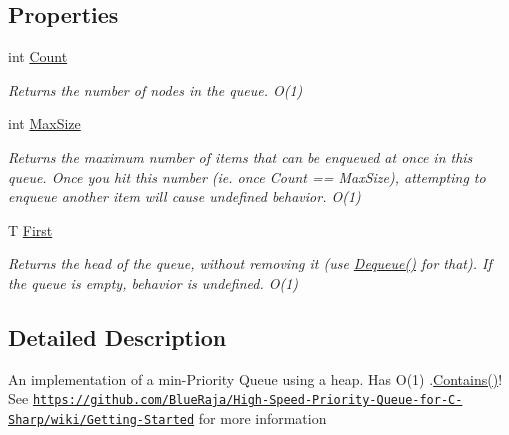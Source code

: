 \subsection*{Properties}
\begin{DoxyCompactItemize}
\item 
int \hyperlink{class_priority___queue_1_1_fast_priority_queue_ae439e87d078e219b8bcd8fa59f3b5750}{Count}
\begin{DoxyCompactList}\small\item\em Returns the number of nodes in the queue. O(1) \end{DoxyCompactList}\item 
int \hyperlink{class_priority___queue_1_1_fast_priority_queue_a1dc8784035e6432aa2851a5251cb72bf}{Max\+Size}
\begin{DoxyCompactList}\small\item\em Returns the maximum number of items that can be enqueued at once in this queue. Once you hit this number (ie. once Count == Max\+Size), attempting to enqueue another item will cause undefined behavior. O(1) \end{DoxyCompactList}\item 
T \hyperlink{class_priority___queue_1_1_fast_priority_queue_ada99ea4007e6af6c84660d088bb054fc}{First}
\begin{DoxyCompactList}\small\item\em Returns the head of the queue, without removing it (use \hyperlink{class_priority___queue_1_1_fast_priority_queue_ac1b1d19f0769e01956cdcb1fbd5f08ac}{Dequeue()} for that). If the queue is empty, behavior is undefined. O(1) \end{DoxyCompactList}\end{DoxyCompactItemize}


\subsection{Detailed Description}
An implementation of a min-\/\+Priority Queue using a heap. Has O(1) .\hyperlink{class_priority___queue_1_1_fast_priority_queue_ac7ed1c55afc22b9f492576675d0651c7}{Contains()}! See \href{https://github.com/BlueRaja/High-Speed-Priority-Queue-for-C-Sharp/wiki/Getting-Started}{\tt https\+://github.\+com/\+Blue\+Raja/\+High-\/\+Speed-\/\+Priority-\/\+Queue-\/for-\/\+C-\/\+Sharp/wiki/\+Getting-\/\+Started} for more information 


